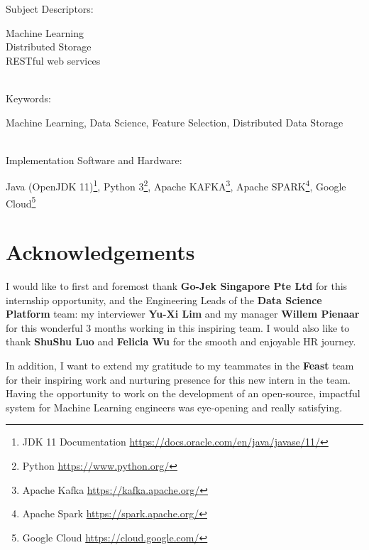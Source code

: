 \documentclass[a4paper, 12pt, fleqn]{report}
\begin{document}
 Subject Descriptors:
\\ \begin{addmargin}[2em]{2em}
  Machine Learning \\
  Distributed Storage \\
  RESTful web services
\end{addmargin}
\ \\

 Keywords:
\\ \begin{addmargin}[2em]{2em}
  Machine Learning, Data Science, Feature Selection, Distributed Data Storage
\end{addmargin}
\ \\ 

 Implementation Software and Hardware:
\\ \begin{addmargin}[2em]{2em}
  Java (OpenJDK 11)\footnote{JDK 11 Documentation \url{https://docs.oracle.com/en/java/javase/11/}},
  Python 3\footnote{Python \url{https://www.python.org/}},
  Apache KAFKA\footnote{Apache Kafka \url{https://kafka.apache.org/}},
  Apache SPARK\footnote{Apache Spark \url{https://spark.apache.org/}},
  Google Cloud\footnote{Google Cloud \url{https://cloud.google.com/}}
\end{addmargin}


\chapter*{Acknowledgements}
\doublespacing


I would like to first and foremost thank \textbf{Go-Jek Singapore Pte Ltd} for
this internship opportunity, and the Engineering Leads of the \textbf{Data
  Science Platform} team: my interviewer \textbf{Yu-Xi Lim} and my manager
\textbf{Willem Pienaar} for this wonderful 3 months working in this inspiring
team. I would also like to thank \textbf{ShuShu Luo} and \textbf{Felicia Wu} for
the smooth and enjoyable HR journey.
\newline


In addition, I want to extend my gratitude to my teammates in the \textbf{Feast}
team for their inspiring work and nurturing presence for this new intern in the
team. Having the opportunity to work on the development of an open-source,
impactful system for Machine Learning engineers was eye-opening and really
satisfying. \newline
\end{document}
